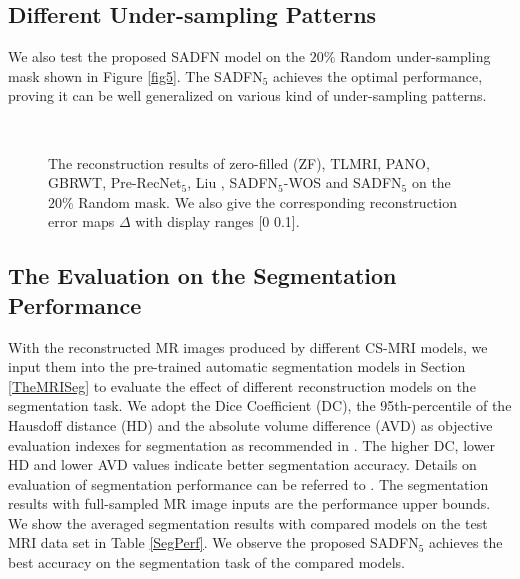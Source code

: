 \documentclass[runningheads]{llncs}
\begin{document}
\subsection{Different Under-sampling Patterns}

We also test the proposed SADFN model on the $20\%$ Random under-sampling mask shown in Figure \ref{fig5}. The SADFN$_5$ achieves the optimal performance, proving it can be well generalized on various kind of under-sampling patterns.

\begin{figure}[htb!]
\begin{center}
   \\
   \caption{The reconstruction results of zero-filled (ZF), TLMRI, PANO, GBRWT, Pre-RecNet$_5$, Liu \cite{27}, SADFN$_5$-WOS and SADFN$_5$ on the $20\%$ Random mask. We also give the corresponding reconstruction error maps $\Delta$ with display ranges [0 0.1].}
\label{fig7}
\end{center}
\end{figure}

\subsection{The Evaluation on the Segmentation Performance}

With the reconstructed MR images produced by different CS-MRI models, we input them into the pre-trained automatic segmentation models in Section \ref{TheMRISeg} to evaluate the effect of different reconstruction models on the segmentation task. We adopt the Dice Coefficient (DC), the 95th-percentile of the Hausdoff distance (HD) and the absolute volume difference (AVD) as objective evaluation indexes for segmentation as recommended in \cite{29}. The higher DC, lower HD and lower AVD values indicate better segmentation accuracy. Details on evaluation of segmentation performance can be referred to \cite{29}. The segmentation results with full-sampled MR image inputs are the performance upper bounds. We show the averaged segmentation results with compared models on the test MRI data set in Table \ref{SegPerf}. We observe the proposed SADFN$_5$ achieves the best accuracy on the segmentation task of the compared models.
\end{document}
